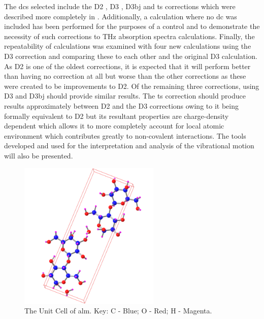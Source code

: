 The \acrshort{dc}s selected include the D2 \cite{Grimme2006}, D3 \cite{Grimme2010}, D3\acrshort{bj} \cite{Becke2005} and \acrshort{ts} \cite{Tkatchenko2009} corrections which were described more completely in . Additionally, a calculation where no \acrshort{dc} was included has been performed for the purposes of a control and to demonstrate the necessity of such corrections to THz absorption spectra calculations. Finally, the repeatability of calculations was examined with four new calculations using the D3 correction and comparing these to each other and the original D3 calculation. As D2 is one of the oldest corrections, it is expected that it will perform better than having no correction at all but worse than the other corrections as these were created to be improvements to D2. Of the remaining three corrections, using D3 and D3\acrshort{bj} should provide similar results. The \acrshort{ts} correction should produce results approximately between D2 and the D3 corrections owing to it being formally equivalent to D2 but its resultant properties are charge\nobreakdash-density dependent which allows it to more completely account for local atomic environment which contributes greatly to non-covalent interactions. The tools developed and used for the interpretation and analysis of the vibrational motion will also be presented.

\begin{figure}[t]
    \centering
    \includegraphics[width=0.6\textwidth]{Figures/Analysis/IVDW/aLM_struct_UC_2.png}
    \captionsetup{font = footnotesize, justification = centering}
    \caption[The Unit Cell of \(\alpha\)-Lactose Monohydrate]{The Unit Cell of \acrshort{alm}. Key: C - Blue; O - Red; H - Magenta.}
    \label{fig:aLM_Structure}
\end{figure}


